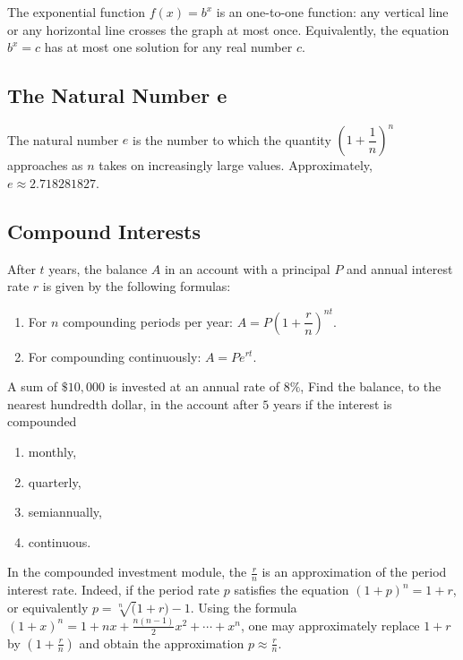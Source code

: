 \begin{remark}

The exponential function \(f(x)=b^x\) is an one-to-one function: any
vertical line or any horizontal line crosses the graph at most once.
Equivalently, the equation \(b^x=c\) has at most one solution for any
real number \(c\).

\end{remark}

\subsection{The Natural Number e}

The natural number \(e\) is the number to which the quantity
\(\left(1+\dfrac1n\right)^n\) approaches as \(n\) takes on increasingly
large values. Approximately, \(e\approx 2.718281827\).

\subsection{Compound Interests}

After \(t\) years, the balance \(A\) in an account with a principal
\(P\) and annual interest rate \(r\) is given by the following formulas:

\begin{enumerate}
\item
  For \(n\) compounding periods per year:
  \(A=P\left(1+\dfrac{r}{n}\right)^{nt}\).
\item
  For compounding continuously: \(A=Pe^{rt}\).
\end{enumerate}

\begin{example}

A sum of \(\$10,000\) is invested at an annual rate of \(8\%\), Find the
balance, to the nearest hundredth dollar, in the account after \(5\)
years if the interest is compounded

\begin{enumerate}
\item
  monthly,
\item
  quarterly,
\item
  semiannually,
\item
  continuous.
\end{enumerate}

\end{example}

\begin{remark}

In the compounded investment module, the \(\frac rn\) is an
approximation of the period interest rate. Indeed, if the period rate
\(p\) satisfies the equation \((1+p)^n=1+r\), or equivalently
\(p=\sqrt[n](1+r) - 1\). Using the formula
\((1+x)^n=1+nx+\frac{n(n-1)}{2}x^2+\cdots +x^n\), one may approximately
replace \(1+r\) by \((1+\frac rn)\) and obtain the approximation
\(p\approx \frac rn\).

\end{remark}


